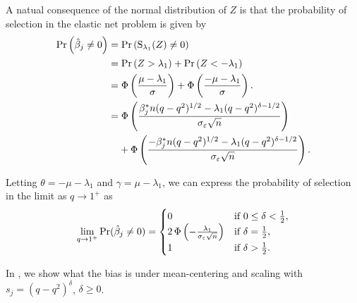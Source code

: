 A natual consequence of the normal distribution of \(Z\) is that the probability of selection in the elastic net problem is given by
\begin{align*}
  \Pr\left(\hat{\beta}_j \neq 0\right) & = \Pr\left(\st_{\lambda_1}(Z) \neq 0\right)                                                                                         \\
                                       & = \Pr\left(Z > \lambda_1\right) + \Pr\left(Z < -\lambda_1\right)                                                                    \\
                                       & = \cdf\left(\frac{\mu - \lambda_1}{\sigma}\right) + \cdf\left(\frac{- \mu -\lambda_1}{\sigma}\right).                               \\
                                       & = \cdf \left( \frac{\beta_j^*n (q-q^2)^{1/2} - \lambda_1(q-q^2)^{\delta - 1/2}}{\sigma_\varepsilon \sqrt{n}}\right)                 \\
                                       & \phantom{={}} + \cdf \left( \frac{-\beta_j^*n (q-q^2)^{1/2} - \lambda_1(q-q^2)^{\delta - 1/2}}{\sigma_\varepsilon \sqrt{n}}\right).
\end{align*}

Letting \(\theta = -\mu - \lambda_1 \) and \(\gamma = \mu - \lambda_1\), we can express the probability of selection in the limit as \(q \rightarrow 1^+\) as
\[
  \lim_{q \rightarrow 1^+} \Pr(\hat{\beta}_j \neq 0) =
  \begin{cases}
    0                                                            & \text{if } 0 \leq \delta < \frac{1}{2}, \\
    2\operatorname{\Phi}\left(-\frac{\lambda_1}{\sigma_\varepsilon \sqrt{n}}\right) & \text{if } \delta = \frac{1}{2},        \\
    1                                                            & \text{if } \delta > \frac{1}{2}.
  \end{cases}
\]

In , we show what the
bias is under mean-centering and scaling with \(s_j = (q - q^2)^\delta\), \(\delta \geq 0\).

